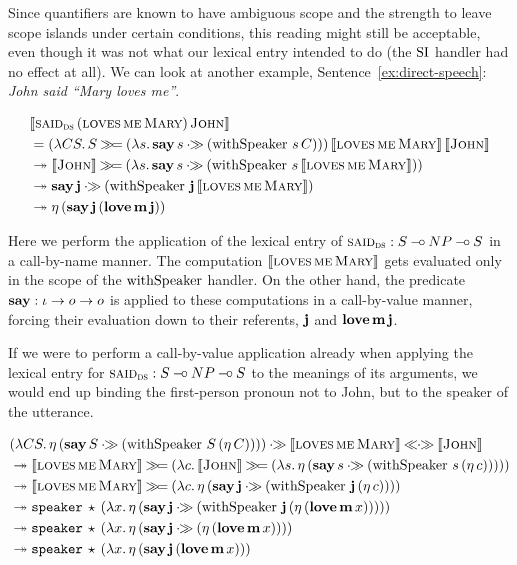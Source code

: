 Since quantifiers are known to have ambiguous scope and the strength to
leave scope islands under certain conditions, this reading might still be
acceptable, even though it was not what our lexical entry intended to do
(the $\operatorname{SI}$ handler had no effect at all). We can look at another example,
Sentence~\ref{ex:direct-speech}: \emph{John said ``Mary loves me''}.

\begin{align*}
& \sem{\app{\abs{said}_{\abs{ds}}}{(\app{\abs{loves}}{\abs{me}}{\abs{Mary}})}{\abs{John}}} \\
&= \app{(\lam{C S}{S \hsbind (\lam{s}{\ap{\obj{say}}{s} \apr (\app{\withSpeaker}{s}{C})})})}
       {\sem{\app{\abs{loves}}{\abs{me}}{\abs{Mary}}}}{\sem{\abs{John}}} \\
&\tto \sem{\abs{John}} \hsbind (\lam{s}{\ap{\obj{say}}{s} \apr (\app{\withSpeaker}{s}{\sem{\app{\abs{loves}}{\abs{me}}{\abs{Mary}}}})}) \\
&\tto \ap{\obj{say}}{\obj{j}} \apr (\app{\withSpeaker}{\obj{j}}{\sem{\app{\abs{loves}}{\abs{me}}{\abs{Mary}}}}) \\
&\tto \etaE{(\app{\obj{say}}{\obj{j}}{(\app{\obj{love}}{\obj{m}}{\obj{j}})})}
\end{align*}

Here we perform the application of the lexical entry of
$\textsc{said}_{\textsc{ds}} : S \mathbin{{-}\mkern-3.5mu{\circ}} NP \mathbin{{-}\mkern-3.5mu{\circ}} S$ in a call-by-name manner. The
computation $\llbracket \textsc{loves}\,\textsc{me}\,\textsc{Mary} \rrbracket$ gets evaluated
only in the scope of the $\operatorname{withSpeaker}$ handler. On the other hand, the
predicate $\textbf{say} : \iota \to o \to o$ is applied to these computations
in a call-by-value manner, forcing their evaluation down to their
referents, $\textbf{j}$ and $\textbf{love}\,\textbf{m}\,\textbf{j}$.

If we were to perform a call-by-value application already when applying the
lexical entry for $\textsc{said}_{\textsc{ds}} : S \mathbin{{-}\mkern-3.5mu{\circ}} NP \mathbin{{-}\mkern-3.5mu{\circ}} S$ to the
meanings of its arguments, we would end up binding the first-person pronoun
not to John, but to the speaker of the utterance.

\begin{align*}
&(\lam{C S}{\etaE{(\ap{\obj{say}}{S} \apr (\app{\withSpeaker}{S}{(\etaE{C})}))}})
  \apr \sem{\app{\abs{loves}}{\abs{me}}{\abs{Mary}}} \aplr \sem{\abs{John}} \\
&\tto \sem{\app{\abs{loves}}{\abs{me}}{\abs{Mary}}} \hsbind (\lam{c}{
  \sem{\abs{John}} \hsbind (\lam{s}{
  \etaE{(\ap{\obj{say}}{s} \apr (\app{\withSpeaker}{s}{(\etaE{c})}))}})}) \\
&\tto \sem{\app{\abs{loves}}{\abs{me}}{\abs{Mary}}} \hsbind (\lam{c}{
  \etaE{(\ap{\obj{say}}{\obj{j}} \apr (\app{\withSpeaker}{\obj{j}}{(\etaE{c})}))}}) \\
&\tto \app{\op{speaker}}{\star}{(\lam{x}{
   \etaE{(\ap{\obj{say}}{\obj{j}} \apr (\app{\withSpeaker}{\obj{j}}{(\etaE{(\app{\obj{love}}{\obj{m}}{x})})}))}})} \\
&\tto \app{\op{speaker}}{\star}{(\lam{x}{
   \etaE{(\ap{\obj{say}}{\obj{j}} \apr (\etaE{(\app{\obj{love}}{\obj{m}}{x})}))}})} \\
&\tto \app{\op{speaker}}{\star}{(\lam{x}{
   \etaE{(\app{\obj{say}}{\obj{j}}{(\app{\obj{love}}{\obj{m}}{x})})}})}
\end{align*}

